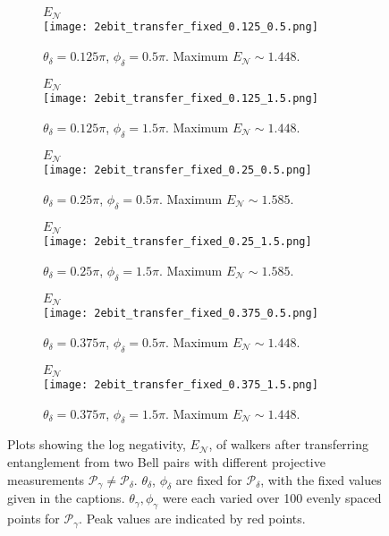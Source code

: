 \begin{appendices}
\begin{figure}
    \centering
    \medskip
    \begin{subfigure}{0.49\textwidth}
        \centering
        $E_\mathcal{N}$\\
        \texttt{[image: 2ebit\_transfer\_fixed\_0.125\_0.5.png]}
        \caption{$\theta_\delta = 0.125\pi$, $\phi_\delta = 0.5\pi$. Maximum $E_\mathcal{N}\sim 1.448$.}
    \end{subfigure}
    \hfill
    \begin{subfigure}{0.49\textwidth}
        \centering
        $E_\mathcal{N}$\\
        \texttt{[image: 2ebit\_transfer\_fixed\_0.125\_1.5.png]}
        \caption{$\theta_\delta = 0.125\pi$, $\phi_\delta = 1.5\pi$. Maximum $E_\mathcal{N}\sim 1.448$.}
    \end{subfigure}
    \par\medskip
    \begin{subfigure}{0.49\textwidth}
        \centering
        $E_\mathcal{N}$\\
        \texttt{[image: 2ebit\_transfer\_fixed\_0.25\_0.5.png]}
        \caption{$\theta_\delta = 0.25\pi$, $\phi_\delta = 0.5\pi$. Maximum $E_\mathcal{N}\sim 1.585$.}
    \end{subfigure}
    \hfill
    \begin{subfigure}{0.49\textwidth}
        \centering
        $E_\mathcal{N}$\\
        \texttt{[image: 2ebit\_transfer\_fixed\_0.25\_1.5.png]}
        \caption{$\theta_\delta = 0.25\pi$, $\phi_\delta = 1.5\pi$. Maximum $E_\mathcal{N}\sim 1.585$.}
    \end{subfigure}
    \par\medskip
    \begin{subfigure}{0.49\textwidth}
        \centering
        $E_\mathcal{N}$\\
        \texttt{[image: 2ebit\_transfer\_fixed\_0.375\_0.5.png]}
        \caption{$\theta_\delta = 0.375\pi$, $\phi_\delta = 0.5\pi$. Maximum $E_\mathcal{N}\sim 1.448$.}
    \end{subfigure}
    \begin{subfigure}{0.49\textwidth}
        \centering
        $E_\mathcal{N}$\\
        \texttt{[image: 2ebit\_transfer\_fixed\_0.375\_1.5.png]}
        \caption{$\theta_\delta = 0.375\pi$, $\phi_\delta = 1.5\pi$. Maximum $E_\mathcal{N}\sim 1.448$.}
    \end{subfigure}
    \caption{Plots showing the log negativity, $E_\mathcal{N}$, of walkers after transferring entanglement from two Bell pairs with different projective measurements $\mathcal{P}_\gamma \neq \mathcal{P}_\delta$. $\theta_\delta$, $\phi_\delta$ are fixed for $\mathcal{P}_\delta$, with the fixed values given in the captions. $\theta_\gamma, \phi_\gamma$ were each varied over 100 evenly spaced points for $\mathcal{P}_\gamma$. Peak values are indicated by red points.}
    \label{fig:2ebits_diff_proj}
\end{figure}


\end{appendices}
